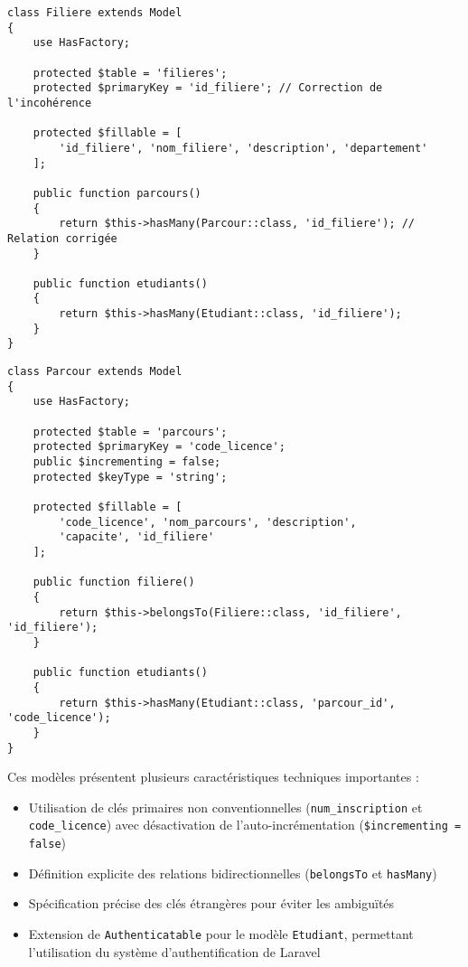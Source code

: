 \documentclass[french,12pt]{report} %
\begin{document}
\begin{lstlisting}[style=phpstyle,caption={Modèle Filiere}]
class Filiere extends Model
{
    use HasFactory;
    
    protected $table = 'filieres';
    protected $primaryKey = 'id_filiere'; // Correction de l'incohérence
    
    protected $fillable = [
        'id_filiere', 'nom_filiere', 'description', 'departement'
    ];
    
    public function parcours()
    {
        return $this->hasMany(Parcour::class, 'id_filiere'); // Relation corrigée
    }
    
    public function etudiants()
    {
        return $this->hasMany(Etudiant::class, 'id_filiere');
    }
}
\end{lstlisting}

\begin{lstlisting}[style=phpstyle,caption={Modèle Parcour}]
class Parcour extends Model
{
    use HasFactory;
    
    protected $table = 'parcours';
    protected $primaryKey = 'code_licence';
    public $incrementing = false;
    protected $keyType = 'string';
    
    protected $fillable = [
        'code_licence', 'nom_parcours', 'description',
        'capacite', 'id_filiere'
    ];
    
    public function filiere()
    {
        return $this->belongsTo(Filiere::class, 'id_filiere', 'id_filiere');
    }
    
    public function etudiants()
    {
        return $this->hasMany(Etudiant::class, 'parcour_id', 'code_licence');
    }
}
\end{lstlisting}

Ces modèles présentent plusieurs caractéristiques techniques importantes :

\begin{itemize}
    \item Utilisation de clés primaires non conventionnelles (\texttt{num\_inscription} et \texttt{code\_licence}) avec désactivation de l'auto-incrémentation (\texttt{\$incrementing = false})
    \item Définition explicite des relations bidirectionnelles (\texttt{belongsTo} et \texttt{hasMany})
    \item Spécification précise des clés étrangères pour éviter les ambiguïtés
    \item Extension de \texttt{Authenticatable} pour le modèle \texttt{Etudiant}, permettant l'utilisation du système d'authentification de Laravel
\end{itemize}
\end{document}
